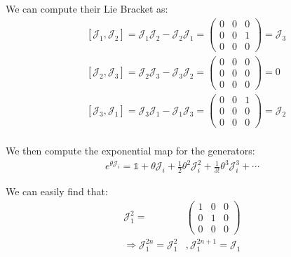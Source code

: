\documentclass[]{ctexart}
\begin{document}
		We can compute their Lie Bracket as:
			\begin{equation*}
			\begin{aligned}
				&\left[\mathcal{J}_1,\mathcal{J}_2\right]=\mathcal{J}_1\mathcal{J}_2-\mathcal{J}_2\mathcal{J}_1=
				\begin{pmatrix}
				0 & 0  & 0 \\
				0 & 0  & 1 \\
				0 & 0  & 0
				\end{pmatrix}=\mathcal{J}_3\\
				&\left[\mathcal{J}_2,\mathcal{J}_3\right]=\mathcal{J}_2\mathcal{J}_3-\mathcal{J}_3\mathcal{J}_2=
				\begin{pmatrix}
				0 & 0  & 0 \\
				0 & 0  & 0 \\
				0 & 0  & 0
				\end{pmatrix}=0\\
				&\left[\mathcal{J}_3,\mathcal{J}_1\right]=\mathcal{J}_3\mathcal{J}_1-\mathcal{J}_1\mathcal{J}_3=
				\begin{pmatrix}
				0 & 0  & 1 \\
				0 & 0  & 0 \\
				0 & 0  & 0
				\end{pmatrix}=\mathcal{J}_2\\
			\end{aligned}
			\end{equation*}
		
		We then compute the exponential map for the generators:
			\begin{equation*}
			\begin{aligned}
				e^{\theta\mathcal{J}_i}=\mathds{1}+\theta\mathcal{J}_i+\frac{1}{2}\theta^2\mathcal{J}_i^2+\frac{1}{3!}\theta^3\mathcal{J}_i^3+\cdots
			\end{aligned}
			\end{equation*}
		
		We can easily find that:
			\begin{equation*}
			\begin{aligned}
				\mathcal{J}_1^2=&
				\begin{pmatrix}
				1 & 0  & 0 \\
				0 & 1  & 0 \\
				0 & 0  & 0
				\end{pmatrix}\\
				\Rightarrow
				\mathcal{J}_1^{2n}=\mathcal{J}_1^2&,\mathcal{J}_1^{2n+1}=\mathcal{J}_1
			\end{aligned}
			\end{equation*}
			
\end{document}
